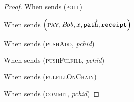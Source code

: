 \begin{proof}
  When \environment{} sends (\textsc{poll})

  When \environment{} sends $\left(\textsc{pay}, \mathit{Bob}, x,
  \overrightarrow{\mathtt{path}}, \mathtt{receipt}\right)$

  When \environment{} sends (\textsc{pushAdd}, \textit{pchid})

  When \environment{} sends (\textsc{pushFulfill}, \textit{pchid})

  When \environment{} sends (\textsc{fulfillOnChain})

  When \environment{} sends (\textsc{commit}, \textit{pchid})
\end{proof}
